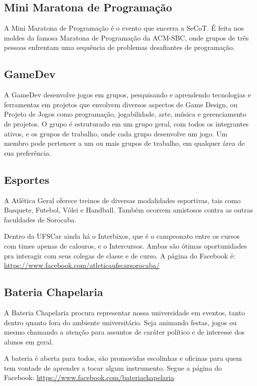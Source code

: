 \subsection{Mini Maratona de Programação}
A Mini Maratona de Programação é o evento que encerra a SeCoT. É feita nos moldes da famosa Maratona de Programação da ACM-SBC, onde grupos de três pessoas enfrentam uma sequência de problemas desafiantes de programação.

\subsection{GameDev}
A GameDev desenvolve jogos em grupos, pesquisando e aprendendo tecnologias e ferramentas em projetos que envolvem diversos aspectos de Game Design, ou Projeto de Jogos como programação, jogabilidade, arte, música e gerenciamento de projetos. \newline
O grupo é estruturado em um grupo geral, com todos os integrantes ativos, e os grupos de trabalho, onde cada grupo desenvolve um jogo. Um membro pode pertencer a um ou mais grupos de trabalho, em qualquer área de sua preferência.

\subsection{Esportes}
A Atlética Geral oferece treinos de diversas modalidades esportivas, tais como Basquete, Futebol, Vôlei e Handball. Também ocorrem amistosos contra as outras faculdades de Sorocaba.

Dentro da UFSCar ainda há o Interbixos, que é o campeonato entre os cursos com times apenas de calouros, e o Intercursos. Ambas são ótimas oportunidades pra interagir com seus colegas de classe e de curso. A página do Facebook é: \url{https://www.facebook.com/atleticaufscarsorocaba/}

\subsection{Bateria Chapelaria}
A Bateria Chapelaria procura representar nossa universidade em eventos, tanto dentro quanto fora do ambiente universitário. Seja animando festas, jogos ou mesmo chamando a atenção para assuntos de caráter político e de interesse dos alunos em geral.

A bateria é aberta para todos, são promovidas escolinhas e oficinas para quem tem vontade de aprender a tocar algum instrumento. Segue a página do Facebook: \newline \url{https://www.facebook.com/bateriachapelaria}

